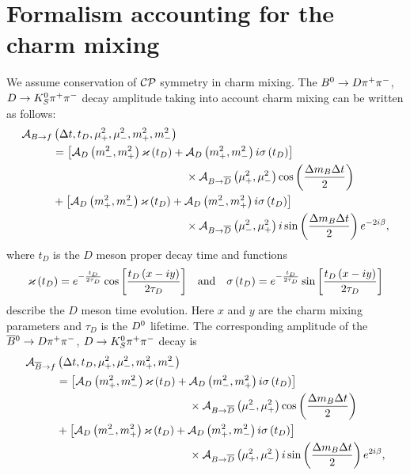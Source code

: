 \documentclass[a4paper,11pt]{article}
\begin{document}
\section{\boldmath Formalism accounting for the charm mixing}\label{app:charm-mixing}
We assume conservation of $\mathcal{CP}$ symmetry in charm mixing.  The $B^0\to D\pi^+\pi^-$, $D\to K_S^0\pi^+\pi^-$
decay amplitude taking into account charm mixing can be written as follows:
\begin{equation}\label{eq:time-pdf-mixing-ampl}
 \begin{split}
  \mathcal{A}_{B\to f}&\left( \Delta t, t_D, \mu^2_{+},\mu^2_{-}, m_+^2, m_-^2 \right) \\
  &= \left[\mathcal{A}_D\left(m_-^2,m_+^2\right)\varkappa\left( t_D \right) + \mathcal{A}_D\left(m_+^2,m_-^2\right)    i\sigma\left( t_D \right)\right] \\
  &\quad\quad\quad\quad\quad\quad\quad\quad\quad\quad\quad\quad
  \times \mathcal{A}_{B\to\overline{D}}\left(\mu^2_{+},\mu^2_{-}\right)     \cos\left(\frac{\Delta m_B\Delta t}{2}\right) \\
  &+ \left[\mathcal{A}_D\left(m_+^2,m_-^2\right)   \varkappa\left( t_D \right) + \mathcal{A}_D\left(m_-^2,m_+^2\right) i\sigma\left( t_D \right)\right] \\
  &\quad\quad\quad\quad\quad\quad\quad\quad\quad\quad\quad\quad
  \times \mathcal{A}_{B\to\overline{D}}\left(\mu^2_{-},\mu^2_{+}\right) i\sin\left(\frac{\Delta m_B\Delta t}{2}\right) e^{-2i\beta},
 \end{split}
\end{equation}
where $t_D$ is the $D$ meson proper decay time and functions
\begin{equation}\label{eq:kappa}
  \varkappa\left( t_D\right) = e^{-\frac{t_D}{2\tau_D}}
     \cos{\left[\frac{t_D\left(x- iy\right)}{2\tau_D}\right]}\quad
  \mathrm{and}\quad
  \sigma\left(    t_D \right) = e^{-\frac{t_D}{2\tau_D}}
     \sin{\left[\frac{t_D\left(x- iy\right)}{2\tau_D}\right]}
\end{equation}
describe the $D$ meson time evolution. Here $x$ and $y$ are the charm mixing 
parameters and $\tau_D$ is the $D^0$ lifetime.  The corresponding amplitude 
of the $\overline{B}{}^0\to D\pi^+\pi^-$, $D\to K_S^0\pi^+\pi^-$ decay is
\begin{equation}\label{eq:time-pdf-mixing-ampl-bar}
 \begin{split}
  \mathcal{A}_{\overline{B}\to f}&\left( \Delta t, t_D, \mu^2_{+},\mu^2_{-}, m_+^2, m_-^2 \right) \\
  &= \left[\mathcal{A}_D\left(m_+^2,m_-^2\right)   \varkappa\left( t_D \right) + \mathcal{A}_D\left(m_-^2,m_+^2\right) i\sigma\left( t_D \right)\right] \\
  &\quad\quad\quad\quad\quad\quad\quad\quad\quad\quad\quad\quad
  \times \mathcal{A}_{B\to\overline{D}}\left(\mu^2_{-},\mu^2_{+}\right)  \cos\left(\frac{\Delta m_B\Delta t}{2}\right) \\
  &+ \left[\mathcal{A}_D\left(m_-^2,m_+^2\right)\varkappa\left( t_D \right) + \mathcal{A}_D\left(m_+^2,m_-^2\right)    i\sigma\left( t_D \right)\right] \\
  &\quad\quad\quad\quad\quad\quad\quad\quad\quad\quad\quad\quad
  \times \mathcal{A}_{B\to\overline{D}}\left(\mu^2_{+},\mu^2_{-}\right)    i\sin\left(\frac{\Delta m_B\Delta t}{2}\right) e^{2i\beta},
 \end{split}
\end{equation}
\end{document}
